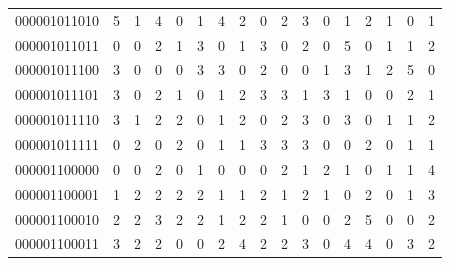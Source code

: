 \documentclass[10pt,a4paper]{article}
\begin{document}
\begin{longtable}{ |c|c|c|c|c|c|c|c|c|c|c|c|c|c|c|c|c| }
    000001011010              & 5                            & 1                                & 4                            & 0                              & 1   & 4   & 2   & 0   & 2   & 3   & 0   & 1   & 2   & 1   & 0   & 1   \\
    000001011011              & 0                            & 0                                & 2                            & 1                              & 3   & 0   & 1   & 3   & 0   & 2   & 0   & 5   & 0   & 1   & 1   & 2   \\
    000001011100              & 3                            & 0                                & 0                            & 0                              & 3   & 3   & 0   & 2   & 0   & 0   & 1   & 3   & 1   & 2   & 5   & 0   \\
    000001011101              & 3                            & 0                                & 2                            & 1                              & 0   & 1   & 2   & 3   & 3   & 1   & 3   & 1   & 0   & 0   & 2   & 1   \\
    000001011110              & 3                            & 1                                & 2                            & 2                              & 0   & 1   & 2   & 0   & 2   & 3   & 0   & 3   & 0   & 1   & 1   & 2   \\
    000001011111              & 0                            & 2                                & 0                            & 2                              & 0   & 1   & 1   & 3   & 3   & 3   & 0   & 0   & 2   & 0   & 1   & 1   \\
    000001100000              & 0                            & 0                                & 2                            & 0                              & 1   & 0   & 0   & 0   & 2   & 1   & 2   & 1   & 0   & 1   & 1   & 4   \\
    000001100001              & 1                            & 2                                & 2                            & 2                              & 2   & 1   & 1   & 2   & 1   & 2   & 1   & 0   & 2   & 0   & 1   & 3   \\
    000001100010              & 2                            & 2                                & 3                            & 2                              & 2   & 1   & 2   & 2   & 1   & 0   & 0   & 2   & 5   & 0   & 0   & 2   \\
    000001100011              & 3                            & 2                                & 2                            & 0                              & 0   & 2   & 4   & 2   & 2   & 3   & 0   & 4   & 4   & 0   & 3   & 2   \\

\end{longtable}
\end{document}

